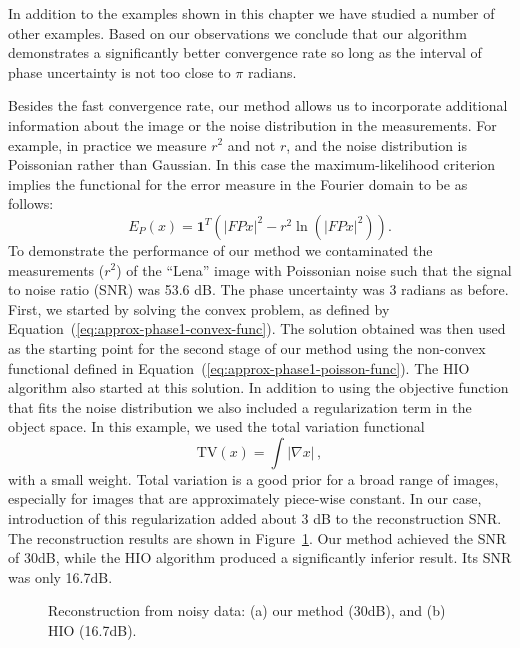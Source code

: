In addition to the examples shown in this chapter we have studied
a number of other examples. Based on our observations we conclude that
our algorithm demonstrates a significantly better convergence rate so
long as
the interval of phase uncertainty is not too close to $\pi$
radians.%

Besides the fast convergence rate, our method allows us to incorporate
additional information about the image or the noise distribution in
the measurements. For example, in practice  we measure
$r^2$ and not $r$, and the noise distribution is Poissonian rather than
Gaussian. In this case the
maximum-likelihood criterion implies the functional for the error
measure in the Fourier domain to be as follows:
\begin{equation}
  \label{eq:approx-phase1-poisson-func}
  E_P(x) = \mathbf{1}^T \left(
    |FPx|^2-r^2\ln\left(|FPx|^2\right)
  \right).
\end{equation}
To demonstrate the performance of our method we contaminated the
measurements ($r^2$) of the ``Lena'' image with Poissonian noise such that
the signal to noise ratio (SNR) was 53.6 dB. The phase uncertainty was
3 radians as before. First, we started by solving the convex problem,
as defined by Equation~(\ref{eq:approx-phase1-convex-func}). The solution obtained
was then used as the starting point for the second stage of our
method using  the non-convex functional defined in
Equation~(\ref{eq:approx-phase1-poisson-func}). The HIO algorithm also started at
this solution. In addition to using the objective function that fits
the noise distribution we also included a regularization term in the
object space. In this example, we used the total variation
functional~
\begin{equation}
  \label{eq:total-variation}
 \mathrm{TV}(x) = \int |\nabla x|\,, 
\end{equation}
with a small weight. Total variation is a good prior for a broad range
of images, especially for images that are approximately piece-wise
constant. In our case, introduction of this regularization added about
3 dB to the reconstruction SNR. The reconstruction results are shown in
Figure~\ref{fig:reconstruction-noise}. Our method achieved the SNR of
30dB, while the HIO algorithm produced a significantly inferior
result. Its SNR was only 16.7dB.
\begin{figure}[t]
  \centering
  \hspace{.1\linewidth}
\caption[Reconstruction from noisy data]{Reconstruction from noisy
  data: (a) our method (30dB), and (b) HIO (16.7dB).}
\label{fig:reconstruction-noise}
\end{figure}
